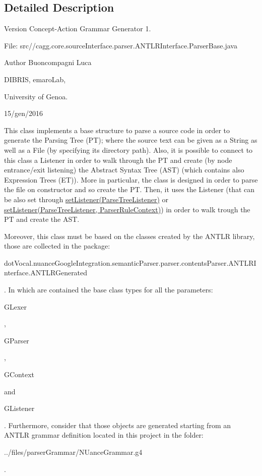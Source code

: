 \subsection{Detailed Description}
\begin{DoxyVersion}{Version}
Concept-\/\-Action Grammar Generator 1. \par
 File\-: src//cagg.core.\-source\-Interface.\-parser.\-A\-N\-T\-L\-R\-Interface.\-Parser\-Base.\-java \par

\end{DoxyVersion}
\begin{DoxyAuthor}{Author}
Buoncompagni Luca \par
 D\-I\-B\-R\-I\-S, emaro\-Lab,\par
 University of Genoa. \par
 15/gen/2016 \par

\end{DoxyAuthor}


This class implements a base structure to parse a source code in order to generate the Parsing Tree (P\-T); where the source text can be given as a String as well as a File (by specifying its directory path). Also, it is possible to connect to this class a Listener in order to walk through the P\-T and create (by node entrance/exit listening) the Abstract Syntax Tree (A\-S\-T) (which contains also Expression Trees (E\-T)). More in particular, the class is designed in order to parse the file on constructor and so create the P\-T. Then, it uses the Listener (that can be also set through \hyperlink{}{set\-Listener(\-Parse\-Tree\-Listener)} or \hyperlink{}{set\-Listener(\-Parse\-Tree\-Listener, Parser\-Rule\-Context)}) in order to walk trough the P\-T and create the A\-S\-T.\par


Moreover, this class must be based on the classes created by the A\-N\-T\-L\-R library, those are collected in the package\-: 
\begin{DoxyCode}
dotVocal.nuanceGoogleIntegration.semanticParser.parser.contentsParser.ANTLRInterface.ANTLRGenerated 
\end{DoxyCode}
 . In which are contained the base class types for all the parameters\-:
\begin{DoxyCode}
GLexer 
\end{DoxyCode}
 ,
\begin{DoxyCode}
GParser 
\end{DoxyCode}
 ,
\begin{DoxyCode}
GContext 
\end{DoxyCode}
 and
\begin{DoxyCode}
GListener 
\end{DoxyCode}
 . Furthermore, consider that those objects are generated starting from an A\-N\-T\-L\-R grammar definition located in this project in the folder\-:
\begin{DoxyCode}
../files/parserGrammar/NUanceGrammar.g4 
\end{DoxyCode}
 .\par


